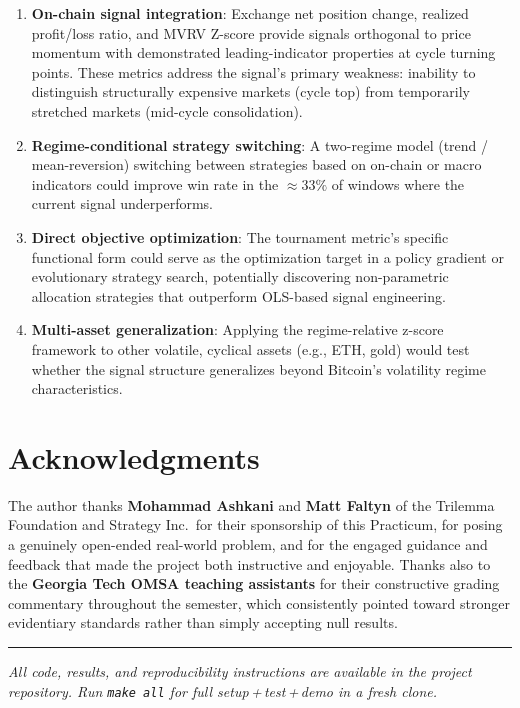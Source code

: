 \documentclass[11pt,letterpaper]{article}
\begin{document}
\begin{enumerate}
  \item \textbf{On-chain signal integration}: Exchange net position change,
    realized profit/loss ratio, and MVRV Z-score provide signals orthogonal to
    price momentum with demonstrated leading-indicator properties at cycle turning
    points.  These metrics address the signal's primary weakness: inability to
    distinguish structurally expensive markets (cycle top) from temporarily
    stretched markets (mid-cycle consolidation).

  \item \textbf{Regime-conditional strategy switching}: A two-regime model
    (trend / mean-reversion) switching between strategies based on on-chain or
    macro indicators could improve win rate in the $\approx33\%$ of windows
    where the current signal underperforms.

  \item \textbf{Direct objective optimization}: The tournament metric's specific
    functional form could serve as the optimization target in a policy gradient
    or evolutionary strategy search, potentially discovering non-parametric
    allocation strategies that outperform OLS-based signal engineering.

  \item \textbf{Multi-asset generalization}: Applying the regime-relative
    z-score framework to other volatile, cyclical assets (e.g., ETH, gold) would
    test whether the signal structure generalizes beyond Bitcoin's volatility
    regime characteristics.
\end{enumerate}

\section*{Acknowledgments}

The author thanks \textbf{Mohammad Ashkani} and \textbf{Matt Faltyn} of the
Trilemma Foundation and Strategy Inc.\ for their sponsorship of this Practicum,
for posing a genuinely open-ended real-world problem, and for the engaged
guidance and feedback that made the project both instructive and enjoyable.
Thanks also to the \textbf{Georgia Tech OMSA teaching assistants} for their
constructive grading commentary throughout the semester, which consistently
pointed toward stronger evidentiary standards rather than simply accepting
null results.

\bigskip
\noindent\rule{\textwidth}{0.4pt}

\noindent\small\textit{All code, results, and reproducibility instructions are
available in the project repository.  Run \texttt{make all} for full
setup\,+\,test\,+\,demo in a fresh clone.}
\end{document}
